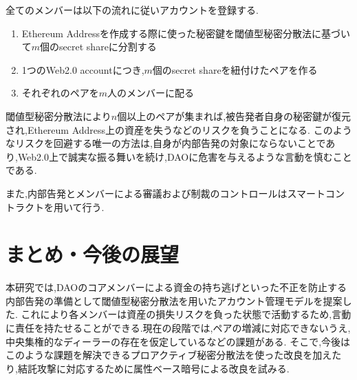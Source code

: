 \documentclass[twocolumn,10pt]{jarticle}
\begin{document}
全てのメンバーは以下の流れに従いアカウントを登録する.

\begin{enumerate}
  \vspace{-5pt}
  \item Ethereum Addressを作成する際に使った秘密鍵を閾値型秘密分散法に基づいて$m$個のsecret shareに分割する\vspace{-5pt}
  \item 1つのWeb2.0 accountにつき,$m$個のsecret shareを紐付けたペアを作る\vspace{-5pt}
  \item それぞれのペアを$m$人のメンバーに配る\vspace{-5pt}
\end{enumerate}

閾値型秘密分散法により$n$個以上のペアが集まれば,被告発者自身の秘密鍵が復元され,Ethereum Address上の資産を失うなどのリスクを負うことになる.
このようなリスクを回避する唯一の方法は,自身が内部告発の対象にならないことであり,Web2.0上で誠実な振る舞いを続け,DAOに危害を与えるような言動を慎むことである.

また,内部告発とメンバーによる審議および制裁のコントロールはスマートコントラクトを用いて行う.
\vspace{-0.55cm}
\section{\normalsize まとめ・今後の展望}
\vspace{-0.2cm}
本研究では,DAOのコアメンバーによる資金の持ち逃げといった不正を防止する内部告発の準備として閾値型秘密分散法を用いたアカウント管理モデルを提案した.
これにより各メンバーは資産の損失リスクを負った状態で活動するため,言動に責任を持たせることができる.現在の段階では,ペアの増減に対応できないうえ,中央集権的なディーラーの存在を仮定しているなどの課題がある.
そこで,今後はこのような課題を解決できるプロアクティブ秘密分散法を使った改良を加えたり,結託攻撃に対応するために属性ベース暗号による改良を試みる.
\end{document}
